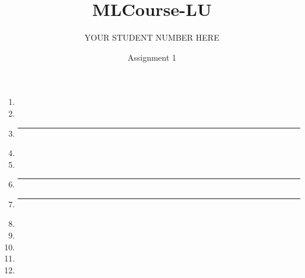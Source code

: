 \documentclass{article}
\title{MLCourse-LU}
\author{YOUR STUDENT NUMBER HERE}
\date{Assignment 1}
\begin{document}
\maketitle

\begin{enumerate}
    \item %
    \item %
    \item %
    \hrule
    \item %
    \item %
    \item %
    
    \hrule
    \item %
    
    \hrule
    \item %
    \item %
    \item %
    \item %
    \item %
\end{enumerate}
\end{document}
